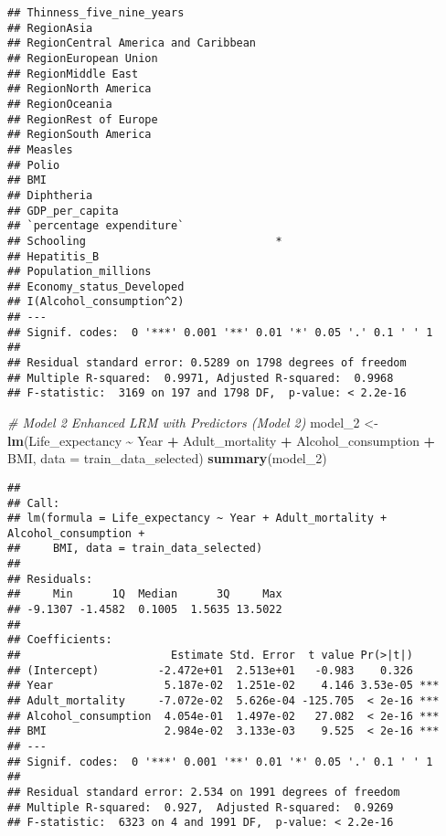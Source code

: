 \documentclass[
]{article}
\newenvironment{Shaded}{\begin{snugshade}}{\end{snugshade}}
\newcommand{\AttributeTok}[1]{\textcolor[rgb]{0.13,0.29,0.53}{#1}}
\newcommand{\CommentTok}[1]{\textcolor[rgb]{0.56,0.35,0.01}{\textit{#1}}}
\newcommand{\FunctionTok}[1]{\textcolor[rgb]{0.13,0.29,0.53}{\textbf{#1}}}
\newcommand{\NormalTok}[1]{#1}
\newcommand{\OtherTok}[1]{\textcolor[rgb]{0.56,0.35,0.01}{#1}}
\newcommand{\SpecialCharTok}[1]{\textcolor[rgb]{0.81,0.36,0.00}{\textbf{#1}}}
\begin{document}
\begin{verbatim}
## Thinness_five_nine_years                 
## RegionAsia                               
## RegionCentral America and Caribbean      
## RegionEuropean Union                     
## RegionMiddle East                        
## RegionNorth America                      
## RegionOceania                            
## RegionRest of Europe                     
## RegionSouth America                      
## Measles                                  
## Polio                                    
## BMI                                      
## Diphtheria                               
## GDP_per_capita                           
## `percentage expenditure`                 
## Schooling                             *  
## Hepatitis_B                              
## Population_millions                      
## Economy_status_Developed                 
## I(Alcohol_consumption^2)                 
## ---
## Signif. codes:  0 '***' 0.001 '**' 0.01 '*' 0.05 '.' 0.1 ' ' 1
## 
## Residual standard error: 0.5289 on 1798 degrees of freedom
## Multiple R-squared:  0.9971, Adjusted R-squared:  0.9968 
## F-statistic:  3169 on 197 and 1798 DF,  p-value: < 2.2e-16
\end{verbatim}

\begin{Shaded}
\begin{Highlighting}[]
\CommentTok{\# Model 2 Enhanced LRM with Predictors (Model 2)}
\NormalTok{model\_2 }\OtherTok{\textless{}{-}} \FunctionTok{lm}\NormalTok{(Life\_expectancy }\SpecialCharTok{\textasciitilde{}}\NormalTok{ Year }\SpecialCharTok{+}\NormalTok{ Adult\_mortality }\SpecialCharTok{+}\NormalTok{ Alcohol\_consumption }\SpecialCharTok{+}\NormalTok{ BMI, }\AttributeTok{data =}\NormalTok{ train\_data\_selected)}
\FunctionTok{summary}\NormalTok{(model\_2)}
\end{Highlighting}
\end{Shaded}

\begin{verbatim}
## 
## Call:
## lm(formula = Life_expectancy ~ Year + Adult_mortality + Alcohol_consumption + 
##     BMI, data = train_data_selected)
## 
## Residuals:
##     Min      1Q  Median      3Q     Max 
## -9.1307 -1.4582  0.1005  1.5635 13.5022 
## 
## Coefficients:
##                       Estimate Std. Error  t value Pr(>|t|)    
## (Intercept)         -2.472e+01  2.513e+01   -0.983    0.326    
## Year                 5.187e-02  1.251e-02    4.146 3.53e-05 ***
## Adult_mortality     -7.072e-02  5.626e-04 -125.705  < 2e-16 ***
## Alcohol_consumption  4.054e-01  1.497e-02   27.082  < 2e-16 ***
## BMI                  2.984e-02  3.133e-03    9.525  < 2e-16 ***
## ---
## Signif. codes:  0 '***' 0.001 '**' 0.01 '*' 0.05 '.' 0.1 ' ' 1
## 
## Residual standard error: 2.534 on 1991 degrees of freedom
## Multiple R-squared:  0.927,  Adjusted R-squared:  0.9269 
## F-statistic:  6323 on 4 and 1991 DF,  p-value: < 2.2e-16
\end{verbatim}
\end{document}
